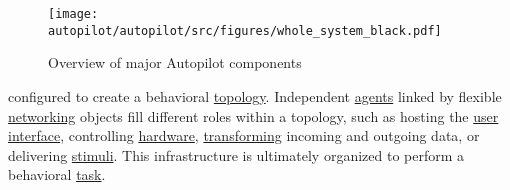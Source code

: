 \begin{figure*}[ht!]
\texttt{[image: autopilot/autopilot/src/figures/whole\_system\_black.pdf]}
\caption{Overview of major Autopilot components}
\end{figure*}

\break configured to create a behavioral \hyperref[sec:topology]{topology}. Independent \hyperref[sec:agents]{agents} linked by flexible \hyperref[sec:networking]{networking} objects fill different roles within a topology, such as hosting the \hyperref[sec:ui]{user interface}, controlling \hyperref[sec:hardware]{hardware}, \hyperref[sec:transforms]{transforming} incoming and outgoing data, or delivering \hyperref[sec:stim]{stimuli}. This infrastructure is ultimately organized to perform a behavioral \hyperref[sec:tasks]{task}.